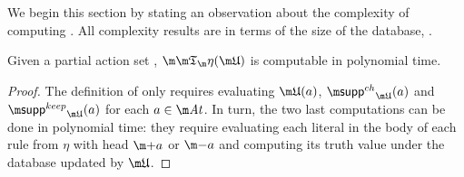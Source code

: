 We begin this section by stating an observation about the complexity of computing \Ap.
All complexity results are in terms of the size of the database, \fulldb.
\begin{proposition}
  \label{prop:At-poly}
  Given a partial action set \UUU, 
  $\Ap(\UUU)$ is computable in polynomial time. %
\end{proposition}
\begin{proof}
    The definition of \Ap only requires evaluating $\UUU(a)$, $\suppin_{\UUU}(a)$ and $\suppout_{\UUU}(a)$ for each $a\in\atoms$.
    In turn, the two last computations can be done in polynomial time: they require evaluating each literal in the body of each rule from $\eta$ with head $\add a$ or $\remove a$ and computing its truth value under the database updated by $\UUU$.
\end{proof}

